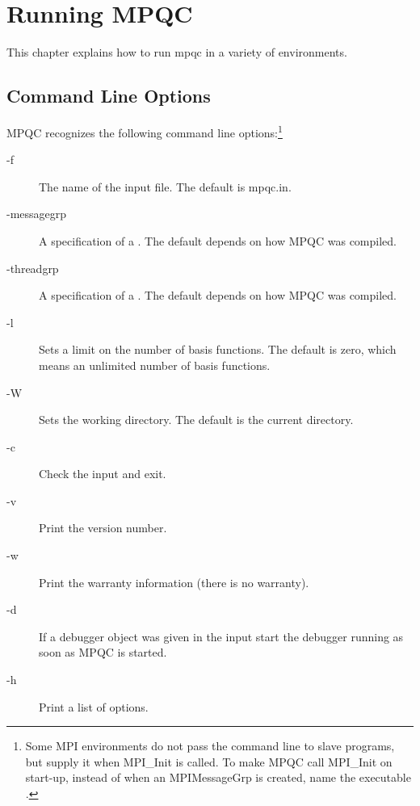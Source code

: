 
\chapter{Running MPQC}
\label{running mpqc}

This chapter explains how to run mpqc in a variety of environments.

\section{Command Line Options}

  MPQC recognizes the following command line options:\footnote{
Some MPI environments do not pass the command line to slave programs, but
supply it when MPI\_Init is called.  To make MPQC call MPI\_Init on start-up,
instead of when an MPIMessageGrp is created, name the executable
.}

\begin{description}
\item[{\ttfamily -f}] The name of the input file.  The default is
                     {\ttfamily mpqc.in}.
\item[{\ttfamily -messagegrp}] A  specification of a
                       .
                      The default depends on how MPQC was compiled.
\item[{\ttfamily -threadgrp}] A  specification of a
                       .
                      The default depends on how MPQC was compiled.
\item[{\ttfamily -l}] Sets a limit on the number of basis functions.
                     The default is zero, which means an unlimited number
                     of basis functions.
\item[{\ttfamily -W}] Sets the working directory.  The default is the
                      current directory.
\item[{\ttfamily -c}] Check the input and exit.
\item[{\ttfamily -v}] Print the version number.
\item[{\ttfamily -w}] Print the warranty information (there is no
                      warranty).
\item[{\ttfamily -d}] If a debugger object was given in the input
                      start the debugger running as soon as MPQC
                      is started.
\item[{\ttfamily -h}] Print a list of options.
\end{description}

